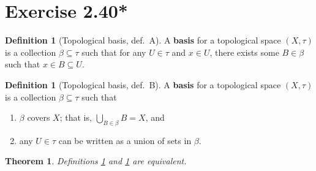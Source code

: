 \documentclass{article}
\newtheorem{theorem}[subsection]{Theorem}
\theoremstyle{definition}
\newtheorem{definition}[subsection]{Definition}
\begin{document}
\section{Exercise 2.40*}
\begin{definition}[Topological basis, def.\ A]\label{topbasisA}
A \textbf{basis} for a topological space $(X,\tau)$ is a collection $\beta \subseteq \tau$ 
such that for any $U \in \tau$ and $x \in U$, there exists some $B \in \beta$ such that
$x \in B \subseteq U$.
\end{definition}
\begin{definition}[Topological basis, def.\ B]\label{topbasisB}
A \textbf{basis} for a topological space $(X,\tau)$ is a collection $\beta \subseteq \tau$ such that
\begin{enumerate}
\item $\beta$ covers $X$; that is, $\bigcup_{B \in \beta} B = X$, and
\item any $U \in \tau$ can be written as a union of sets in $\beta$.
\end{enumerate}
\end{definition}
\begin{theorem}
Definitions \ref{topbasisA} and \ref{topbasisB} are equivalent.
\end{theorem}
\end{document}
